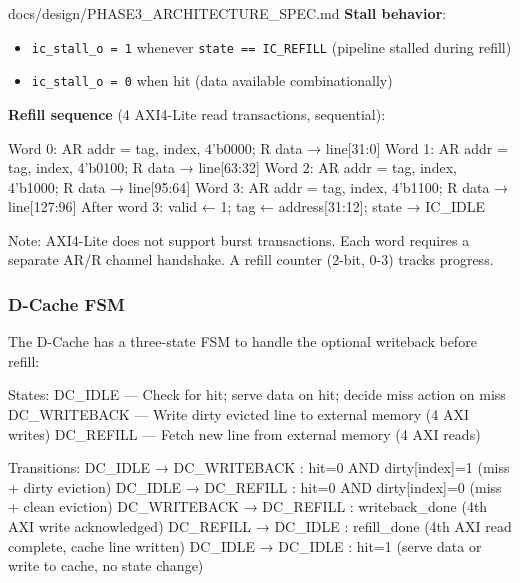 \begin{relocated}{docs/design/PHASE3_ARCHITECTURE_SPEC.md}
\textbf{Stall behavior}:

\begin{itemize}
\tightlist
\item
  \texttt{ic\_\allowbreak{}stall\_\allowbreak{}o\ =\allowbreak{}\ 1}
  whenever
  \texttt{state\ =\allowbreak{}=\allowbreak{}\ IC\_\allowbreak{}REFILL}
  (pipeline stalled during refill)
\item
  \texttt{ic\_\allowbreak{}stall\_\allowbreak{}o\ =\allowbreak{}\ 0}
  when hit (data available combinationally)
\end{itemize}

\textbf{Refill sequence} (4 AXI4-Lite read transactions, sequential):

\begin{textblock}
Word 0: AR addr = {tag, index, 4'b0000}; R data → line[31:0]
Word 1: AR addr = {tag, index, 4'b0100}; R data → line[63:32]
Word 2: AR addr = {tag, index, 4'b1000}; R data → line[95:64]
Word 3: AR addr = {tag, index, 4'b1100}; R data → line[127:96]
After word 3: valid ← 1; tag ← address[31:12]; state → IC_IDLE
\end{textblock}

Note: AXI4-Lite does not support burst transactions. Each word requires
a separate AR/R channel handshake. A refill counter (2-bit, 0-3) tracks
progress.

\subsubsection{D-Cache FSM}\label{ds:ch:phase3-architecture:32-d-cache-fsm}

The D-Cache has a three-state FSM to handle the optional writeback
before refill:

\begin{textblock}
States:
  DC_IDLE       — Check for hit; serve data on hit; decide miss action on miss
  DC_WRITEBACK  — Write dirty evicted line to external memory (4 AXI writes)
  DC_REFILL     — Fetch new line from external memory (4 AXI reads)

Transitions:
  DC_IDLE → DC_WRITEBACK : hit=0 AND dirty[index]=1 (miss + dirty eviction)
  DC_IDLE → DC_REFILL    : hit=0 AND dirty[index]=0 (miss + clean eviction)
  DC_WRITEBACK → DC_REFILL : writeback_done (4th AXI write acknowledged)
  DC_REFILL → DC_IDLE      : refill_done (4th AXI read complete, cache line written)
  DC_IDLE → DC_IDLE        : hit=1 (serve data or write to cache, no state change)
\end{textblock}


\end{relocated}
